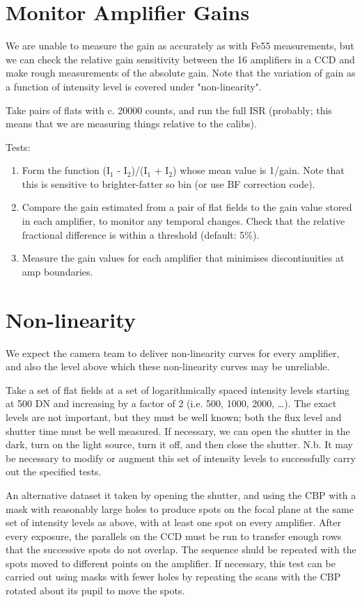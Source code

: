 \documentclass[DM,authoryear,toc,lsstdraft]{lsstdoc}
\begin{document}
\section{Monitor Amplifier Gains}

We are unable to measure the gain as accurately as with Fe55 measurements, but we can check the relative
gain sensitivity between the 16 amplifiers in a CCD and make rough measurements of the absolute gain. Note
that the variation of gain as a function of intensity level is covered under "non-linearity".

Take pairs of flats with c. 20000 counts, and run the full ISR (probably; this means that we are measuring
things relative to the calibs).

Tests:
\begin{enumerate}
\item Form the function (I$_{\text{1}}$ - I$_{\text{2}}$)/(I$_{\text{1}}$ + I$_{\text{2}}$) whose mean value is 1/gain.  Note
that this is sensitive to brighter-fatter so bin (or use BF correction code).
\item Compare the gain estimated from a pair of flat fields to the gain value stored in each amplifier, to monitor any temporal changes. Check that the relative fractional difference is within a threshold (default: 5\%).
\item Measure the gain values for each amplifier that minimises discontinuities at amp boundaries.
\end{enumerate}

\section{Non-linearity}

We expect the camera team to deliver non-linearity curves for every amplifier, and also the level above which
these non-linearity curves may be unreliable.

Take a set of flat fields at a set of logarithmically spaced intensity levels starting at 500 DN and
increasing by a factor of 2 (i.e. 500, 1000, 2000, \ldots{}).  The exact levels are not important, but they must be
well known; both the flux level and shutter time must be well measured.  If necessary, we can open the shutter
in the dark, turn on the light source, turn it off, and then close the shutter.  N.b. It may be necessary to
modify or augment this set of intensity levels to successfully carry out the specified tests.

An alternative dataset it taken by opening the shutter, and using the CBP with a mask with reasonably large
holes to produce spots on the focal plane at the same set of intensity levels as above, with at least one
spot on every amplifier.  After every exposure, the parallels on the CCD must be run to transfer enough rows
that the successive spots do not overlap.  The sequence shuld be repeated with the spots moved to different points on the
amplifier.  If necessary, this test can be carried out using masks with fewer holes by repeating the scans
with the CBP rotated about its pupil to move the spots.
\end{document}
